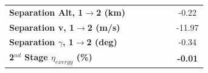 \begin{table}[ht]
\begin{tabular}{l c c c c c c}
		\textbf{Separation Alt, 1$\rightarrow$2 (km)}
		& \firstsecondSeparationAltmSPARTANNinetyFiveNoReturn
		& \firstsecondSeparationAltmSPARTANNinetySevenFiveNoReturn
		& \firstsecondSeparationAltmSPARTANStandardNoReturn
		& \firstsecondSeparationAltmSPARTANOneHundredTwoFiveNoReturn
		& \firstsecondSeparationAltmSPARTANOneHundredFiveNoReturn
		&-0.22
		\\
		\textbf{Separation v, 1$\rightarrow$2 (m/s)}
		& \firstsecondSeparationvmSPARTANNinetyFiveNoReturn
		& \firstsecondSeparationvmSPARTANNinetySevenFiveNoReturn
		& \firstsecondSeparationvmSPARTANStandardNoReturn
		& \firstsecondSeparationvmSPARTANOneHundredTwoFiveNoReturn
		& \firstsecondSeparationvmSPARTANOneHundredFiveNoReturn
		&-11.97
		\\
		\textbf{Separation $\gamma$, 1$\rightarrow$2 (deg)}
		& \firstsecondSeparationgammamSPARTANNinetyFiveNoReturn
		& \firstsecondSeparationgammamSPARTANNinetySevenFiveNoReturn
		& \firstsecondSeparationgammamSPARTANStandardNoReturn
		& \firstsecondSeparationgammamSPARTANOneHundredTwoFiveNoReturn
		& \firstsecondSeparationgammamSPARTANOneHundredFiveNoReturn
		&-0.34
		\\
		\hline 
		\textbf{2$^{nd}$ Stage $\eta_{exergy}$ (\%)}
		& \textbf{\secondExergyEffmSPARTANNinetyFiveNoReturn}
		& \textbf{\secondExergyEffmSPARTANNinetySevenFiveNoReturn}
		& \textbf{\secondExergyEffmSPARTANStandardNoReturn}
		& \textbf{\secondExergyEffmSPARTANOneHundredTwoFiveNoReturn}
		& \textbf{\secondExergyEffmSPARTANOneHundredFiveNoReturn}
		& \textbf{-0.01}
		\\
	

\end{tabular}
\end{table}
